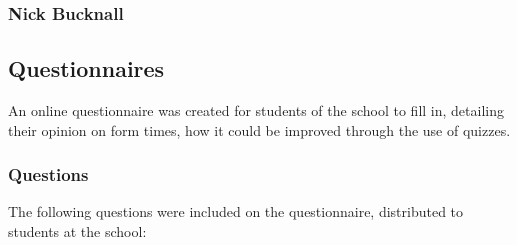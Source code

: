 \subsubsection{Nick Bucknall}

\subsection{Questionnaires}
An online questionnaire was created for students of the school to fill in, detailing their opinion on form times, how it could be improved through the use of quizzes.

\subsubsection{Questions}
The following questions were included	 on the questionnaire, distributed to students at the school:

